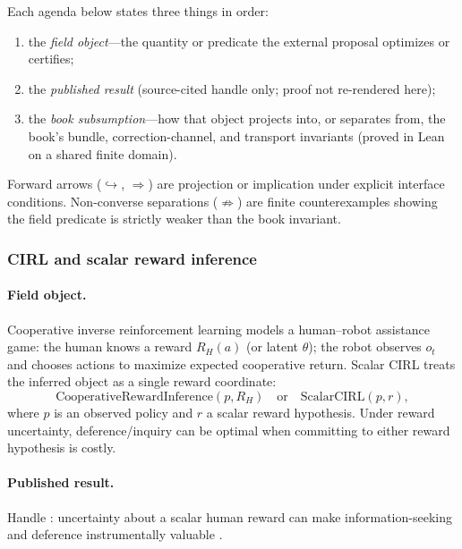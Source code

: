 Each agenda below states three things in order:
\begin{enumerate}
\item the \emph{field object}---the quantity or predicate the external proposal optimizes or certifies;
\item the \emph{published result} (source-cited handle only; proof not re-rendered here);
\item the \emph{book subsumption}---how that object projects into, or separates from, the book's bundle, correction-channel, and transport invariants (proved in Lean on a shared finite domain).
\end{enumerate}
Forward arrows (\(\hookrightarrow\), \(\Rightarrow\)) are projection or implication under explicit interface conditions.
Non-converse separations (\(\not\Rightarrow\)) are finite counterexamples showing the field predicate is strictly weaker than the book invariant.

\subsubsection{CIRL and scalar reward inference \autocite{hadfieldmenell2016}}
\label{sec:appi-field-cirl}

\paragraph{Field object.}
Cooperative inverse reinforcement learning models a human--robot assistance game: the human knows a reward \(R_H(a)\) (or latent \(\theta\)); the robot observes \(o_t\) and chooses actions to maximize expected cooperative return.
Scalar CIRL treats the inferred object as a single reward coordinate:
\begin{equation}
\label{appi:eq:field-cirl-scalar}
\text{CooperativeRewardInference}(p,R_H)
\quad\text{or}\quad
\text{ScalarCIRL}(p,r),
\end{equation}
where \(p\) is an observed policy and \(r\) a scalar reward hypothesis.
Under reward uncertainty, deference/inquiry can be optimal when committing to either reward hypothesis is costly.

\paragraph{Published result.}
Handle : uncertainty about a scalar human reward can make information-seeking and deference instrumentally valuable \autocite{hadfieldmenell2016}.

